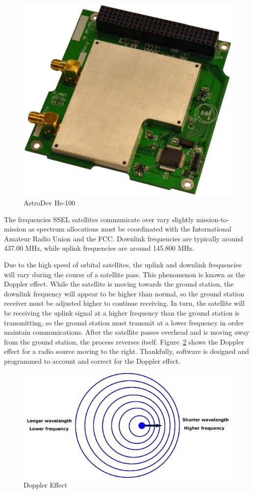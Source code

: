 \documentclass[letter,12pt]{article}
\begin{document}
		\begin{figure}[h!]
			\centering
			\includegraphics[width=.6\textwidth]{./PNGs/He-100_Radio.png}
			\caption{AstroDev He-100 \cite{He-100_Manual}}
			\label{fig:He-100}			
		\end{figure}
		
		The frequencies SSEL satellites communicate over vary slightly mission-to-mission as spectrum allocations must be coordinated with the International Amateur Radio Union and the FCC.  Downlink frequencies are typically around 437.00 MHz, while uplink frequencies are around 145.800 MHz.		
		
		Due to the high speed of orbital satellites, the uplink and downlink frequencies will vary during the course of a satellite pass.  This phenomenon is known as the Doppler effect.  While the satellite is moving towards the ground station, the downlink frequency will appear to be higher than normal, so the ground station receiver must be adjusted higher to continue receiving.  In turn, the satellite will be receiving the uplink signal at a higher frequency than the ground station is transmitting, so the ground station must transmit at a lower frequency in order maintain communications. After the satellite passes overhead and is moving away from the ground station, the process reverses itself. Figure~\ref{doppler_effect} shows the Doppler effect for a radio source moving to the right. Thankfully, software is designed and programmed to account and correct for the Doppler effect.
		
		\begin{figure}[h!]
			\centering
			\includegraphics[width=\textwidth]{./PNGs/doppler_effect.png}
			\caption{Doppler Effect}
			\label{doppler_effect}			
		\end{figure}
		
\end{document}
